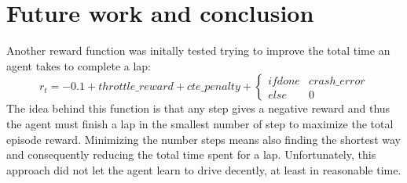 \chapter{Future work and conclusion}

Another reward function was initally tested trying to improve the total time an agent takes to complete a lap:
\begin{equation}
  \label{eq:testreward}
  r_t = - 0.1 + throttle\_reward + cte\_penalty + \left\{\begin{matrix}
    if done & crash\_error \\ 
    else & 0  
    \end{matrix}\right.
\end{equation}
The idea behind this function is that any step gives a negative reward and thus the agent must finish a lap in the smallest number of step to maximize the total episode reward. Minimizing the number steps means also finding the shortest way and consequently reducing the total time spent for a lap. Unfortunately, this approach did not let the agent learn to drive decently, at least in reasonable time.